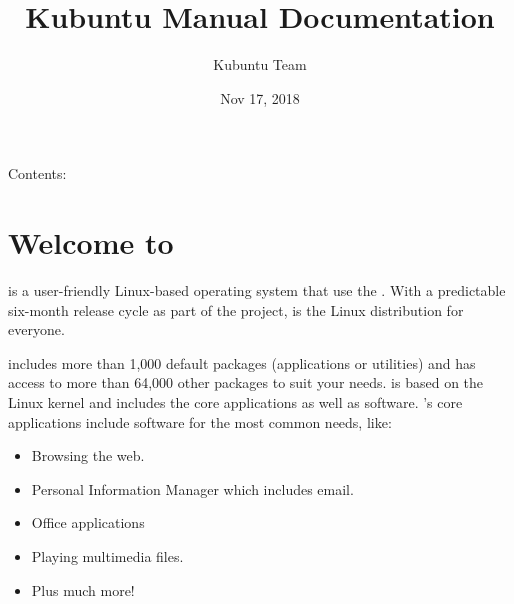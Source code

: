 \documentclass[letterpaper,10pt,english]{sphinxmanual}
\title{Kubuntu Manual Documentation}
\date{Nov 17, 2018}
\author{Kubuntu Team}
\begin{document}
\maketitle
\sphinxtableofcontents
{}\label{\detokenize{index::doc}}


Contents:


\chapter{Welcome to }
\label{\detokenize{welcome:welcome-to-kubuntu}}\label{\detokenize{welcome::doc}}

 is a user-friendly Linux-based operating system that use the  . With a predictable
six-month release cycle as part of the  project,  is the Linux distribution for everyone.

 includes more than 1,000 default packages (applications or utilities) and has access to more than 64,000 other packages to suit your needs.  is based on the Linux kernel and includes the core  applications as well as  software. ’s core applications include software for the most common needs, like:
\begin{itemize}
\item {} 
Browsing the web.

\item {} 
Personal Information Manager which includes email.

\item {} 
Office applications

\item {} 
Playing multimedia files.

\item {} 
Plus much more!

\end{itemize}
\end{document}
